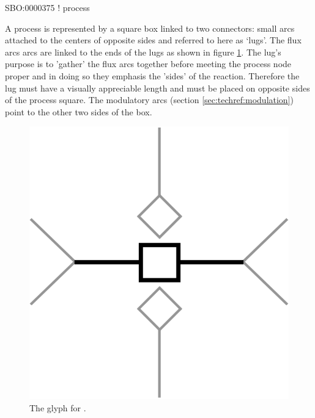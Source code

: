 \begin{glyphDescription}

\glyphSboTerm SBO:0000375 ! process

\glyphNode A process is represented by a square box linked to two
connectors: small arcs attached to the centers of opposite sides and
referred to here as `lugs'. The
flux arcs arcs are linked to the ends of the lugs as shown in figure
\ref{fig:techref:process}. The lug's purpose is to 'gather' the flux arcs
together before meeting the process node proper and in doing so they
emphasis the 'sides' of the reaction. Therefore the lug must have a
visually appreciable length and must be placed on opposite sides
of the process square. The modulatory arcs (section
\ref{sec:techref:modulation}) point to the other two sides of the box.

\end{glyphDescription}

\begin{figure}[htb]
  \centering
  \includegraphics[scale = 0.4]{images/process}
  \caption{The \PD glyph for .}
  \label{fig:techref:process}
\end{figure}


